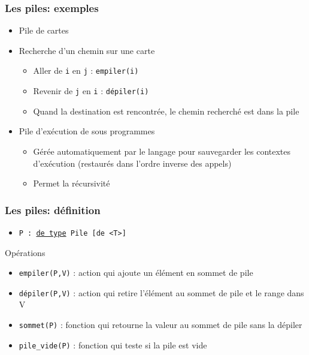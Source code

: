 \documentclass[table,handout,tikz,12pt,svgnames]{beamer}
\begin{document}
\begin{frame}[fragile=singleslide]
	\frametitle{Les piles: exemples}
	\begin{block}{}
		\begin{itemize}
			\item Pile de cartes
			\item Recherche d'un chemin sur une carte
			\begin{itemize}
				\item Aller de \texttt{i} en \texttt{j} : \texttt{empiler(i)}
				\item Revenir de \texttt{j} en \texttt{i} : \texttt{dépiler(i)}
				\item Quand la destination est rencontrée, le chemin recherché est dans la pile
			\end{itemize}
			\item Pile d'exécution de sous ­programmes
			\begin{itemize}
				\item Gérée automatiquement par le langage pour sauvegarder les contextes 
			d'exécution (restaurés dans l'ordre inverse des appels)
				\item Permet la récursivité
			\end{itemize}
		\end{itemize}
	\end{block}
\end{frame}



\begin{frame}[fragile=singleslide]
	\frametitle{Les piles: définition}
	\begin{block}{}
		\begin{itemize}
			\item \texttt{P : \underline{de type} Pile [de <T>]}
		\end{itemize}
	\end{block}
	\begin{block}{Opérations}
		\begin{itemize}
			\item \texttt{empiler(P,V)} : action qui ajoute un élément en sommet de pile
			\item \texttt{dépiler(P,V)} : action qui retire l'élément au sommet de pile et le range dans V
			\item \texttt{sommet(P)} : fonction qui retourne la valeur au sommet de pile sans la dépiler
			\item \texttt{pile\_vide(P)} : fonction qui teste si la pile est vide
		\end{itemize}
	\end{block}	
\end{frame}
\end{document}
